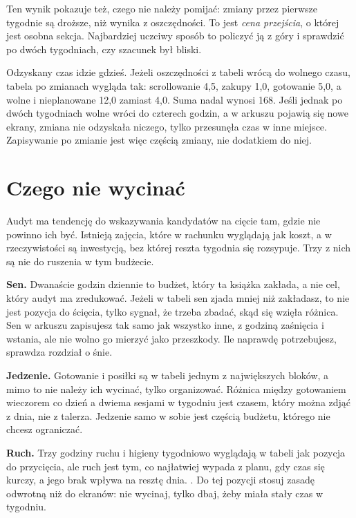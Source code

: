 Ten wynik pokazuje też, czego nie należy pomijać: zmiany przez pierwsze tygodnie są droższe, niż wynika z oszczędności. To jest \emph{cena przejścia}, o której jest osobna sekcja. Najbardziej uczciwy sposób to policzyć ją z góry i sprawdzić po dwóch tygodniach, czy szacunek był bliski.

\begin{uwaga}
Odzyskany czas idzie gdzieś. Jeżeli oszczędności z tabeli wrócą do wolnego czasu, tabela po zmianach wygląda tak: scrollowanie 4,5, zakupy 1,0, gotowanie 5,0, a wolne i nieplanowane 12,0 zamiast 4,0. Suma nadal wynosi 168. Jeśli jednak po dwóch tygodniach wolne wróci do czterech godzin, a w arkuszu pojawią się nowe ekrany, zmiana nie odzyskała niczego, tylko przesunęła czas w inne miejsce. Zapisywanie po zmianie jest więc częścią zmiany, nie dodatkiem do niej.
\end{uwaga}

\section{Czego nie wycinać}

Audyt ma tendencję do wskazywania kandydatów na cięcie tam, gdzie nie powinno ich być. Istnieją zajęcia, które w rachunku wyglądają jak koszt, a w rzeczywistości są inwestycją, bez której reszta tygodnia się rozsypuje. Trzy z nich są nie do ruszenia w tym budżecie.

\textbf{Sen.} Dwanaście godzin dziennie to budżet, który ta książka zakłada, a nie cel, który audyt ma zredukować. Jeżeli w tabeli sen zjada mniej niż zakładasz, to nie jest pozycja do ścięcia, tylko sygnał, że trzeba zbadać, skąd się wzięła różnica. Sen w arkuszu zapisujesz tak samo jak wszystko inne, z godziną zaśnięcia i wstania, ale nie wolno go mierzyć jako przeszkody. Ile naprawdę potrzebujesz, sprawdza rozdział o śnie.

\textbf{Jedzenie.} Gotowanie i posiłki są w tabeli jednym z największych bloków, a mimo to nie należy ich wycinać, tylko organizować. Różnica między gotowaniem wieczorem co dzień a dwiema sesjami w tygodniu jest czasem, który można zdjąć z dnia, nie z talerza. Jedzenie samo w sobie jest częścią budżetu, którego nie chcesz ograniczać.

\textbf{Ruch.} Trzy godziny ruchu i higieny tygodniowo wyglądają w tabeli jak pozycja do przycięcia, ale ruch jest tym, co najłatwiej wypada z planu, gdy czas się kurczy, a jego brak wpływa na resztę dnia. . Do tej pozycji stosuj zasadę odwrotną niż do ekranów: nie wycinaj, tylko dbaj, żeby miała stały czas w tygodniu.

